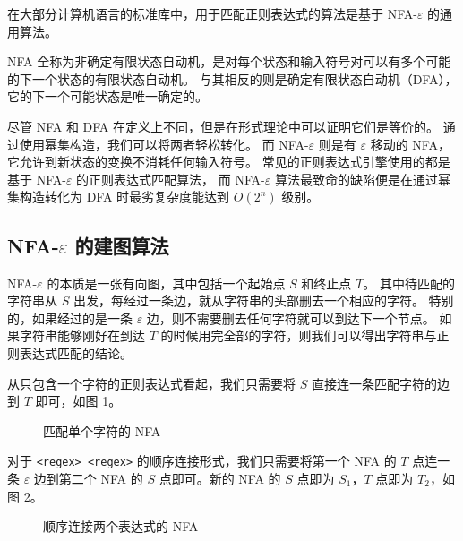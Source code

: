 \documentclass[hyperref,UTF8,12pt,a4paper]{ctexart}
\begin{document}
在大部分计算机语言的标准库中，用于匹配正则表达式的算法是基于 NFA-$\varepsilon$ 的通用算法。

NFA 全称为非确定有限状态自动机，是对每个状态和输入符号对可以有多个可能的下一个状态的有限状态自动机。
与其相反的则是确定有限状态自动机（DFA），它的下一个可能状态是唯一确定的。

尽管 NFA 和 DFA 在定义上不同，但是在形式理论中可以证明它们是等价的。
通过使用幂集构造，我们可以将两者轻松转化。
而 NFA-$\varepsilon$ 则是有 $\varepsilon$ 移动的 NFA，它允许到新状态的变换不消耗任何输入符号。
常见的正则表达式引擎使用的都是基于 NFA-$\varepsilon$ 的正则表达式匹配算法，
而 NFA-$\varepsilon$ 算法最致命的缺陷便是在通过幂集构造转化为 DFA 时最劣复杂度能达到 $O(2^n)$ 级别。

\subsection{NFA-$\varepsilon$ 的建图算法}

NFA-$\varepsilon$ 的本质是一张有向图，其中包括一个起始点 $S$ 和终止点 $T$。
其中待匹配的字符串从 $S$ 出发，每经过一条边，就从字符串的头部删去一个相应的字符。
特别的，如果经过的是一条 $\varepsilon$ 边，则不需要删去任何字符就可以到达下一个节点。
如果字符串能够刚好在到达 $T$ 的时候用完全部的字符，则我们可以得出字符串与正则表达式匹配的结论。

从只包含一个字符的正则表达式看起，我们只需要将 $S$ 直接连一条匹配字符的边到 $T$ 即可，如图 1。

\begin{figure}[h]
	\centering
	\caption{匹配单个字符的 NFA}
\end{figure}

对于 \verb!<regex> <regex>! 的顺序连接形式，我们只需要将第一个 NFA 的 $T$ 点连一条 $\varepsilon$ 边到第二个 NFA 的 $S$ 点即可。新的 NFA 的 $S$ 点即为 $S_1$，$T$ 点即为 $T_2$，如图 2。

\begin{figure}[h]
	\centering
	\caption{顺序连接两个表达式的 NFA}
\end{figure}
\end{document}
